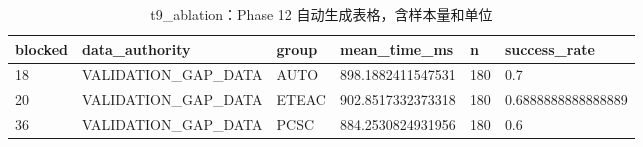 \begin{table}[htbp]
\centering
\caption{t9_ablation：Phase 12 自动生成表格，含样本量和单位}
\begin{tabular}{llllll}
\hline
blocked & data_authority & group & mean_time_ms & n & success_rate \\
\hline
18 & VALIDATION\_GAP\_DATA & AUTO & 898.1882411547531 & 180 & 0.7 \\
20 & VALIDATION\_GAP\_DATA & ETEAC & 902.8517332373318 & 180 & 0.6888888888888889 \\
36 & VALIDATION\_GAP\_DATA & PCSC & 884.2530824931956 & 180 & 0.6 \\
\hline
\end{tabular}
\end{table}
